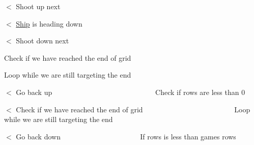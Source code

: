 $<$ Shoot up next

$<$ \mbox{\hyperlink{class_ship}{Ship}} is heading down

$<$ Shoot down next

Check if we have reached the end of grid

Loop while we are still targeting the end

$<$ Go back up ~\newline
~\newline
~\newline
~\newline
~\newline
~\newline
~\newline
~\newline
~\newline
~\newline
~\newline
~\newline
~\newline
~\newline
~\newline
~\newline
~\newline
 Check if rows are less than 0

$<$ Check if we have reached the end of grid ~\newline
~\newline
~\newline
~\newline
~\newline
~\newline
~\newline
~\newline
~\newline
~\newline
~\newline
~\newline
~\newline
~\newline
~\newline
 Loop while we are still targeting the end

$<$ Go back down ~\newline
~\newline
~\newline
~\newline
~\newline
~\newline
~\newline
~\newline
~\newline
~\newline
~\newline
~\newline
~\newline
 If rows is less than game\textquotesingle{}s rows

